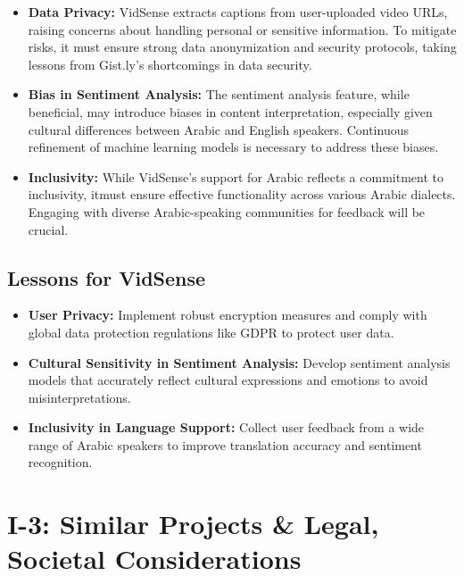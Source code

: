 \documentclass{bscs}
\begin{document}
\begin{itemize}
    \item \textbf{Data Privacy:} VidSense extracts captions from user-uploaded video URLs, raising
concerns about handling personal or sensitive information. To mitigate risks, it must
ensure strong data anonymization and security protocols, taking lessons from Gist.ly’s
shortcomings in data security.  
    
    \item \textbf{Bias in Sentiment Analysis:} The sentiment analysis feature, while beneficial, may
introduce biases in content interpretation, especially given cultural differences between Arabic and English speakers. Continuous refinement of machine learning models is
necessary to address these biases. 

    \item \textbf{Inclusivity:} While VidSense’s support for Arabic reflects a commitment to inclusivity, itmust ensure effective functionality across various Arabic dialects. Engaging with diverse Arabic-speaking communities for feedback will be crucial.

\end{itemize}
    
\subsection{Lessons for VidSense}

\begin{itemize}
    \item \textbf{User Privacy:} Implement robust encryption measures and comply with global data
protection regulations like GDPR to protect user data. 
    
    \item \textbf{Cultural Sensitivity in Sentiment Analysis:}  Develop sentiment analysis models that accurately reflect cultural expressions and emotions to avoid misinterpretations.  

    \item \textbf{Inclusivity in Language Support:} Collect user feedback from a wide range of Arabic
speakers to improve translation accuracy and sentiment recognition.

\end{itemize}

\section{I-3: Similar Projects & Legal, Societal Considerations}
\end{document}
